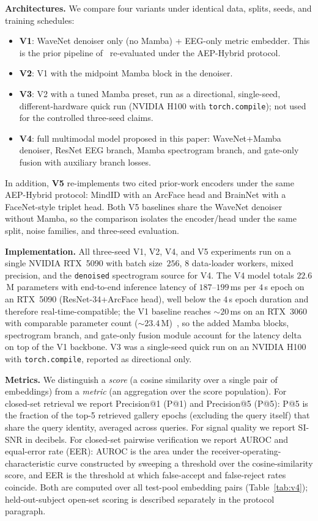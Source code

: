 \documentclass[conference,a4paper]{APSIPA2026}
\begin{document}
\textbf{Architectures.} We compare four variants under identical
data, splits, seeds, and training schedules:
\begin{itemize}
\item \textbf{V1}: WaveNet denoiser only (no Mamba) + EEG-only metric
embedder. This is the prior pipeline of~\cite{vu2026aisei}
re-evaluated under the AEP-Hybrid protocol.
\item \textbf{V2}: V1 with the midpoint Mamba block in the
denoiser.
\item \textbf{V3}: V2 with a tuned Mamba preset, run as a directional,
single-seed, different-hardware quick run (NVIDIA H100 with
\texttt{torch.compile}); not used for the controlled three-seed
claims.
\item \textbf{V4}: full multimodal model proposed in this paper:
WaveNet+Mamba denoiser, ResNet EEG branch, Mamba spectrogram branch, and
gate-only fusion with auxiliary branch losses.
\end{itemize}
In addition, \textbf{V5} re-implements two cited prior-work encoders
under the same AEP-Hybrid protocol: MindID with an ArcFace head and
BrainNet with a FaceNet-style triplet head. Both V5 baselines share the
WaveNet denoiser without Mamba, so the comparison isolates the
encoder/head under the same split, noise families, and three-seed
evaluation.

\textbf{Implementation.} All three-seed V1, V2, V4, and V5 experiments run
on a single NVIDIA RTX~5090 with batch size~$256$, $8$ data-loader
workers, mixed precision, and the \texttt{denoised} spectrogram source
for V4. The V4 model totals $22.6$\,M parameters with end-to-end
inference latency of $187$--$199$\,ms per $4$\,s epoch on an RTX~5090
(ResNet-34+ArcFace head), well below the $4$\,s epoch duration and
therefore real-time-compatible; the V1 baseline reaches $\sim\!20$\,ms
on an RTX~3060 with comparable parameter count
($\sim\!23.4$\,M)~\cite{vu2026aisei}, so the added Mamba blocks,
spectrogram branch, and gate-only fusion module account for the latency
delta on top of the V1 backbone. V3 was a single-seed quick run on an
NVIDIA H100 with \texttt{torch.compile}, reported as directional only.

\textbf{Metrics.} We distinguish a \emph{score} (a cosine similarity
over a single pair of embeddings) from a \emph{metric} (an
aggregation over the score population). For closed-set retrieval we
report Precision@1 (P@1) and Precision@5 (P@5): P@5 is the fraction
of the top-5 retrieved gallery epochs (excluding the query itself)
that share the query identity, averaged across queries. For signal
quality we report SI-SNR in decibels. For closed-set pairwise
verification we report AUROC and equal-error rate (EER):
AUROC is the area under the receiver-operating-characteristic curve
constructed by sweeping a threshold over the cosine-similarity score,
and EER is the threshold at which false-accept and false-reject
rates coincide. Both are computed over all test-pool embedding pairs
(Table~\ref{tab:v4}); held-out-subject open-set scoring is described
separately in the protocol paragraph.
\end{document}
